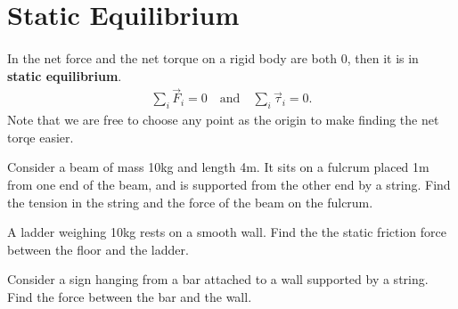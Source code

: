 \documentclass[../classical_mechanics.tex]{subfiles}
\begin{document}
    \section{Static Equilibrium}\label{sec:static-equilibrium}
        \paragraph{}
        In the net force and the net torque on a rigid body are both 0, then it is in \textbf{static equilibrium}.
        \begin{eqnarray}
            \sum_i\vec{F}_i=0\quad\text{and}\quad\sum_i\vec{\tau}_i=0.
        \end{eqnarray}
        Note that we are free to choose any point as the origin to make finding the net torqe easier.
        \begin{example}
            Consider a beam of mass 10kg and length 4m.
            It sits on a fulcrum placed 1m from one end of the beam, and is supported from the other end by a string.
            Find the tension in the string and the force of the beam on the fulcrum.
        \end{example}
        \begin{example}
            A ladder weighing 10kg rests on a smooth wall.
            Find the the static friction force between the floor and the ladder.
        \end{example}
        \begin{example}
            Consider a sign hanging from a bar attached to a wall supported by a string.
            Find the force between the bar and the wall.
        \end{example}
\end{document}
